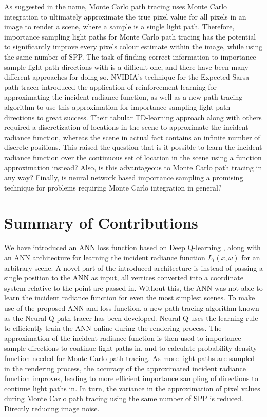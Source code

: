 \documentclass[../dissertation.tex]{subfiles}
\begin{document}
As suggested in the name, Monte Carlo path tracing uses Monte Carlo integration to ultimately approximate the true pixel value for all pixels in an image to render a scene, where a sample is a single light path. Therefore, importance sampling light paths for Monte Carlo path tracing has the potential to significantly improve every pixels colour estimate within the image, while using the same number of SPP. The task of finding correct information to importance sample light path directions with is a difficult one, and there have been many different approaches for doing so. NVIDIA's technique for the Expected Sarsa path tracer introduced the application of reinforcement learning for approximating the incident radiance function, as well as a new path tracing algorithm to use this approximation for importance sampling light path directions to great success. Their tabular TD-learning approach along with others required a discretization of locations in the scene to approximate the incident radiance function, whereas the scene in actual fact contains an infinite number of discrete positions. This raised the question that is it possible to learn the incident radiance function over the continuous set of location in the scene using a function approximation instead? Also, is this advantageous to Monte Carlo path tracing in any way? Finally, is neural network based importance sampling a promising technique for problems requiring Monte Carlo integration in general?

\section{Summary of Contributions}

We have introduced an ANN loss function based on Deep Q-learning \cite{}, along with an ANN architecture for learning the incident radiance function $L_i(x, \omega)$ for an arbitrary scene. A novel part of the introduced architecture is instead of passing a single position to the ANN as input, all vertices converted into a coordinate system relative to the point are passed in. Without this, the ANN was not able to learn the incident radiance function for even the most simplest scenes. To make use of the proposed ANN and loss function, a new path tracing algorithm known as the Neural-Q path tracer has been developed. Neural-Q uses the learning rule to efficiently train the ANN online during the rendering process. The approximation of the incident radiance function is then used to importance sample directions to continue light paths in, and to calculate probability density function needed for Monte Carlo path tracing. As more light paths are sampled in the rendering process, the accuracy of the approximated incident radiance function improves, leading to more efficient importance sampling of directions to continue light paths in. In turn, the variance in the approximation of pixel values during Monte Carlo path tracing using the same number of SPP is reduced. Directly reducing image noise. 
\end{document}
